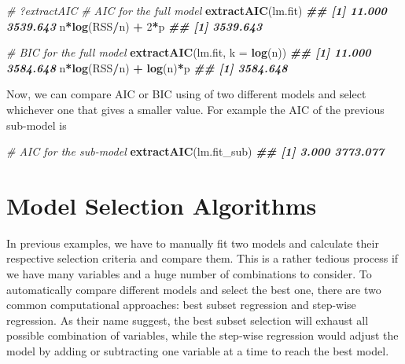\documentclass[
]{book}
\newenvironment{Shaded}{\begin{snugshade}}{\end{snugshade}}
\newcommand{\AttributeTok}[1]{\textcolor[rgb]{0.13,0.29,0.53}{#1}}
\newcommand{\CommentTok}[1]{\textcolor[rgb]{0.56,0.35,0.01}{\textit{#1}}}
\newcommand{\DecValTok}[1]{\textcolor[rgb]{0.00,0.00,0.81}{#1}}
\newcommand{\DocumentationTok}[1]{\textcolor[rgb]{0.56,0.35,0.01}{\textbf{\textit{#1}}}}
\newcommand{\FunctionTok}[1]{\textcolor[rgb]{0.13,0.29,0.53}{\textbf{#1}}}
\newcommand{\NormalTok}[1]{#1}
\newcommand{\SpecialCharTok}[1]{\textcolor[rgb]{0.81,0.36,0.00}{\textbf{#1}}}
\theoremstyle{definition}
\theoremstyle{definition}
\theoremstyle{definition}
\theoremstyle{definition}
\theoremstyle{remark}
\begin{document}
\begin{Shaded}
\begin{Highlighting}[]
    \CommentTok{\# ?extractAIC}
    \CommentTok{\# AIC for the full model}
    \FunctionTok{extractAIC}\NormalTok{(lm.fit)}
\DocumentationTok{\#\# [1]   11.000 3539.643}
\NormalTok{    n}\SpecialCharTok{*}\FunctionTok{log}\NormalTok{(RSS}\SpecialCharTok{/}\NormalTok{n) }\SpecialCharTok{+} \DecValTok{2}\SpecialCharTok{*}\NormalTok{p}
\DocumentationTok{\#\# [1] 3539.643}

    \CommentTok{\# BIC for the full model}
    \FunctionTok{extractAIC}\NormalTok{(lm.fit, }\AttributeTok{k =} \FunctionTok{log}\NormalTok{(n))}
\DocumentationTok{\#\# [1]   11.000 3584.648}
\NormalTok{    n}\SpecialCharTok{*}\FunctionTok{log}\NormalTok{(RSS}\SpecialCharTok{/}\NormalTok{n) }\SpecialCharTok{+} \FunctionTok{log}\NormalTok{(n)}\SpecialCharTok{*}\NormalTok{p}
\DocumentationTok{\#\# [1] 3584.648}
\end{Highlighting}
\end{Shaded}

Now, we can compare AIC or BIC using of two different models and select whichever one that gives a smaller value. For example the AIC of the previous sub-model is

\begin{Shaded}
\begin{Highlighting}[]
    \CommentTok{\# AIC for the sub{-}model}
    \FunctionTok{extractAIC}\NormalTok{(lm.fit\_sub)}
\DocumentationTok{\#\# [1]    3.000 3773.077}
\end{Highlighting}
\end{Shaded}

\hypertarget{model-selection-algorithms}{%
\section{Model Selection Algorithms}\label{model-selection-algorithms}}

In previous examples, we have to manually fit two models and calculate their respective selection criteria and compare them. This is a rather tedious process if we have many variables and a huge number of combinations to consider. To automatically compare different models and select the best one, there are two common computational approaches: best subset regression and step-wise regression. As their name suggest, the best subset selection will exhaust all possible combination of variables, while the step-wise regression would adjust the model by adding or subtracting one variable at a time to reach the best model.
\end{document}
